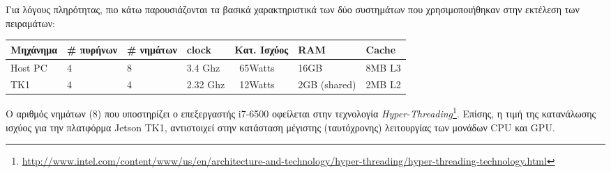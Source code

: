 
Για λόγους πληρότητας, πιο κάτω παρουσιάζονται τα βασικά χαρακτηριστικά
των δύο συστημάτων που χρησιμοποιήθηκαν στην εκτέλεση των πειραμάτων:
\begin{center}
\small
\begin{tabular}{ | l | l | l | l | l | l | l | }
  \hline
  \rowcolor{Gray}
  Μηχάνημα & \# πυρήνων & \# νημάτων & clock & Κατ. Ισχύος & RAM & Cache \\
  \hline
  Host PC & 4 & 8 & 3.4 Ghz & ~65Watts & 16GB & 8MΒ L3 \\
  \hline
  TK1 & 4 & 4 & 2.32 Ghz & ~12Watts & 2GB (shared) & 2MB L2 \\
  \hline
\end{tabular}
\end{center}

Ο αριθμός νημάτων (8) που υποστηρίζει ο επεξεργαστής i7-6500 οφείλεται στην
τεχνολογία \emph{Hyper-Threading}\footnote{\url{http://www.intel.com/content/www/us/en/architecture-and-technology/hyper-threading/hyper-threading-technology.html}}.
Επίσης, η τιμή της κατανάλωσης ισχύος για την
πλατφόρμα Jetson TK1, αντιστοιχεί στην κατάσταση μέγιστης (ταυτόχρονης) λειτουργίας των μονάδων
CPU και GPU.




\newpage


